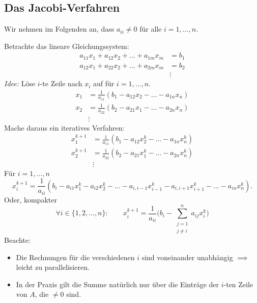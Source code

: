 \subsection{Das Jacobi-Verfahren}
Wir nehmen im Folgenden an, dass $a_{ii} \neq 0$ für alle $i=1,\ldots,n$.

\medskip

Betrachte das lineare Gleichungssystem:
\begin{align*}
    a_{11} x_1+a_{12} x_2+\ldots +a_{1m} x_m & = b_1 \\
    a_{12} x_1+a_{22} x_2+\ldots +a_{2m} x_m & = b_2 \\
    & \vdots
\end{align*}
\emph{Idee:} Löse $i$-te Zeile nach $x_i$ auf für $i=1,\ldots,n$.
\begin{align*}
    x_1 & =\frac{1}{a_{11}} \left(b_1-a_{12} x_2-\ldots -a_{1n} x_n \right) \\
    x_2 & =\frac{1}{a_{22}} \left(b_2-a_{21} x_1-\ldots -a_{2n} x_n \right) \\
    & \vdots
\end{align*}
Mache daraus ein iteratives Verfahren:
\begin{align*}
    x_1^{k+1} & =\frac{1}{a_{11}} \left(b_1-a_{12}x_2^k-\ldots -a_{1n}x_n^k \right) \\
    x_2^{k+1} & =\frac{1}{a_{22}} \left(b_2-a_{21}x_1^k-\ldots -a_{2n}x_n^k \right) \\
    & \vdots
\end{align*}
Für $i=1,\ldots,n$
\begin{equation*}
    x_i^{k+1}=\frac{1}{a_{ii}} \left(b_i-a_{i1}x_1^k-a_{i2}x_2^k-\ldots -a_{i,i-1}x_{i-1}^k-a_{i,i+1}x_{i+1}^k-\ldots -a_{in}x_n^k \right).
\end{equation*}
Oder, kompakter
\begin{equation*}
 \forall i \in \lbrace 1,2,\ldots,n \rbrace \colon
 \qquad
 x_i^{k+1}=\frac{1}{a_{ii}} \bigg(b_i-\sum_{\substack{j=1\\j\neq i}}^n a_{ij}x_i^k \bigg)
\end{equation*}
Beachte: \begin{itemize}
	\item Die Rechnungen für die verschiedenen $i$ sind voneinander unabhängig $\implies$ leicht zu parallelisieren.
	\item In der Praxis gilt die Summe natürlich nur über die Einträge der $i$-ten Zeile von $A$, die $\neq 0$ sind.
\end{itemize}


